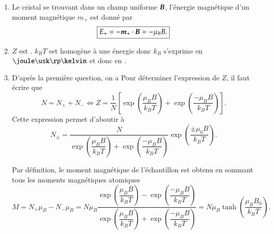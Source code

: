 \begin{corrige}
\begin{enumerate}
\item Le cristal se trouvant dans un champ uniforme $\vecb$, l'énergie magnétique
  d'un moment magnétique $m_+$ est donné par 
  \begin{equation*}
	  \boxed{E_+ = -\vecm_+ \cdot \vecb = -\mu_B B.}
  \end{equation*}

  \item $Z$ est . $k_B T$ est homogène à une énergie donc $k_B$
    s'exprime en $\joule \usk \rp \kelvin$ et donc en \fbox{$\kilogram \usk \meter
    \squared \usk \second \rpsquare \usk \rp \kelvin$}.
  \item D'après la première question, on a 
    Pour déterminer l'expression de $Z$, il faut écrire que 
    \begin{equation*}
	    N = N_+ + N_- \iff \boxed{Z = \dfrac{1}{N}\left[
		    \exp\left(\dfrac{\mu_B B}{k_B T}\right) + 
    \exp\left(\dfrac{-\mu_B B}{k_B T}\right) \right].}
    \end{equation*}
    Cette expression permet d'aboutir à  
    \begin{equation*}
	    \boxed{N_\pm = \dfrac{N}{\exp\left(\dfrac{\mu_B B}{k_B T}\right) + 
		    \exp\left(\dfrac{-\mu_B B}{k_B T}\right)} 
	    \exp\left(\dfrac{\pm \mu_0 B}{k_BT}\right).}
    \end{equation*}

    Par définition, le moment magnétique de l'échantillon est obtenu en sommant
    tous les moments magnétiques atomiques
    \begin{equation*}
	    M = N_+ \mu_B - N_- \mu_B = N \mu_B
		    \dfrac{\exp\left(\dfrac{\mu_B B}{k_B T}\right) - 
		    \exp\left(\dfrac{-\mu_B B}{k_B T}\right)}
		    {\exp\left(\dfrac{\mu_B B}{k_B T}\right) + 
		    \exp\left(\dfrac{-\mu_B B}{k_B T}\right)}
	      = \boxed{N \mu_B \tanh\left(\dfrac{\mu_B B_0}{k_B T}\right).}
    \end{equation*}


\end{enumerate}
\end{corrige}
